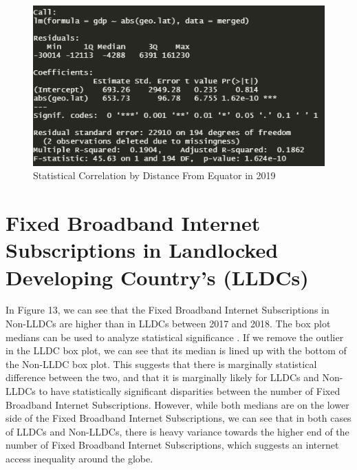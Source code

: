 \documentclass[15pt]{article}
\begin{document}
\begin{figure}[H]
    \centering
    \includegraphics[scale = 0.5]{Part1_dist_from_equator_r^2_2019.PNG}
    \caption{Statistical Correlation by Distance From Equator in 2019}
\end{figure}

\newpage

\section{Fixed Broadband Internet Subscriptions in Landlocked Developing Country's (LLDCs)}

In Figure 13, we can see that the Fixed Broadband Internet Subscriptions in Non-LLDCs are higher than in LLDCs between 2017 and 2018. The box plot medians can be used to analyze statistical significance \cite{5}. If we remove the outlier in the LLDC box plot, we can see that its median is lined up with the bottom of the Non-LLDC box plot. This suggests that there is marginally statistical difference between the two, and that it is marginally likely for LLDCs and Non-LLDCs to have statistically significant disparities between the number of Fixed Broadband Internet Subscriptions. However, while both medians are on the lower side of the Fixed Broadband Internet Subscriptions, we can see that in both cases of LLDCs and Non-LLDCs, there is heavy variance towards the higher end of the number of Fixed Broadband Internet Subscriptions, which suggests an internet access inequality around the globe.
\end{document}
